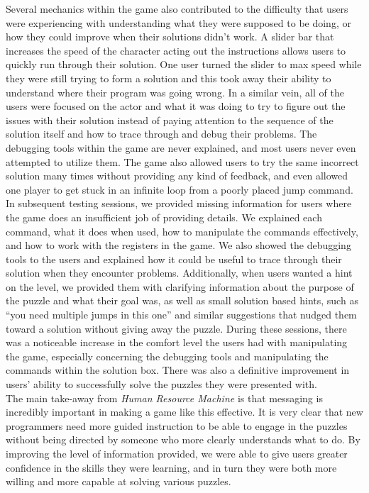 Several mechanics within the game also contributed to the difficulty that users were experiencing with understanding what they were supposed to be doing, or how they could improve when their solutions didn’t work. A slider bar that increases the speed of the character acting out the instructions allows users to quickly run through their solution. One user turned the slider to max speed while they were still trying to form a solution and this took away their ability to understand where their program was going wrong. In a similar vein, all of the users were focused on the actor and what it was doing to try to figure out the issues with their solution instead of paying attention to the sequence of the solution itself and how to trace through and debug their problems. The debugging tools within the game are never explained, and most users never even attempted to utilize them. The game also allowed users to try the same incorrect solution many times without providing any kind of feedback, and even allowed one player to get stuck in an infinite loop from a poorly placed jump command.\\

In subsequent testing sessions, we provided missing information for users where the game does an insufficient job of providing details. We explained each command, what it does when used, how to manipulate the commands effectively, and how to work with the registers in the game. We also showed the debugging tools to the users and explained how it could be useful to trace through their solution when they encounter problems. Additionally, when users wanted a hint on the level, we provided them with clarifying information about the purpose of the puzzle and what their goal was, as well as small solution based hints, such as “you need multiple jumps in this one” and similar suggestions that nudged them toward a solution without giving away the puzzle. During these sessions, there was a noticeable increase in the comfort level the users had with manipulating the game, especially concerning the debugging tools and manipulating the commands within the solution box. There was also a definitive improvement in users’ ability to successfully solve the puzzles they were presented with.\\

The main take-away from \textit{Human Resource Machine} is that messaging is incredibly important in making a game like this effective. It is very clear that new programmers need more guided instruction to be able to engage in the puzzles without being directed by someone who more clearly understands what to do. By improving the level of information provided, we were able to give users greater confidence in the skills they were learning, and in turn they were both more willing and more capable at solving various puzzles.\\


